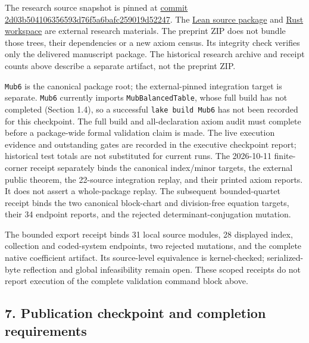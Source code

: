 \documentclass[
]{article}
\begin{document}
The research source snapshot is pinned at
\href{https://github.com/dbccpage/the_symbol_game/tree/2d03b504106356593d76f5a6bafc259019d52247}{commit
2d03b504106356593d76f5a6bafc259019d52247}. The
\href{https://github.com/dbccpage/the_symbol_game/tree/2d03b504106356593d76f5a6bafc259019d52247/lean4/research_programs/mub6}{Lean
source package} and
\href{https://github.com/dbccpage/the_symbol_game/tree/2d03b504106356593d76f5a6bafc259019d52247/omega_engine/crates_rs}{Rust
workspace} are external research materials. The preprint ZIP does not
bundle those trees, their dependencies or a new axiom census. Its
integrity check verifies only the delivered manuscript package. The
historical research archive and receipt counts above describe a separate
artifact, not the preprint ZIP.

\nolinkurl{Mub6} is the canonical package root; the external-pinned
integration target is separate. \nolinkurl{Mub6} currently imports
\nolinkurl{MubBalancedTable}, whose full build has not completed
(Section 1.4), so a successful \nolinkurl{lake build Mub6} has not been
recorded for this checkpoint. The full build and all-declaration axiom
audit must complete before a package-wide formal validation claim is
made. The live execution evidence and outstanding gates are recorded in
the executive checkpoint report; historical test totals are not
substituted for current runs. The 2026-10-11 finite-corner receipt
separately binds the canonical index/minor targets, the external public
theorem, the 22-source integration replay, and their printed axiom
reports. It does not assert a whole-package replay. The subsequent
bounded-quartet receipt binds the two canonical block-chart and
division-free equation targets, their 34 endpoint reports, and the
rejected determinant-conjugation mutation.

The bounded export receipt binds 31 local source modules, 28 displayed
index, collection and coded-system endpoints, two rejected mutations,
and the complete native coefficient artifact. Its source-level
equivalence is kernel-checked; serialized-byte reflection and global
infeasibility remain open. These scoped receipts do not report execution
of the complete validation command block above.

\subsection{7. Publication checkpoint and completion
requirements}\label{publication-checkpoint-and-completion-requirements}
\end{document}
